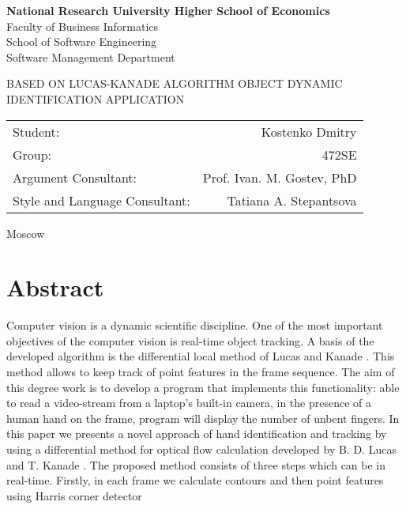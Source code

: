 \documentclass[12pt,a4paper,oneside,titlepage]{article}
\author{Kostenko}
\begin{document}
{
\thispagestyle{empty}
\newpage
\centering

\textbf{
National Research University Higher School of Economics\\
}
Faculty of Business Informatics\\
School of Software Engineering\\
Software Management Department

\vfill


\begin{large}
\MakeTextUppercase{
Based on Lucas-Kanade algorithm Object dynamic identification application
}
\end{large}


\vfill

\begin{tabular}{lr}
Student: & Kostenko Dmitry \\
Group: & 472SE \\
Argument Consultant: & Prof. Ivan. M. Gostev, PhD \\
Style and Language Consultant: & Tatiana A. Stepantsova
\end{tabular}

\vspace{\fill}

Moscow\\ \number\year
\clearpage
}


\section*{Abstract}
{
Computer vision is a dynamic scientific discipline.
One of the most important objectives of the computer vision is real-time object tracking.
A basis of the developed algorithm is the differential local method of Lucas and Kanade \cite{lucasKanade}.
This method allows to keep track of point features in the frame sequence. 
The aim of this degree work is to develop a program that implements this functionality:
able to read a video-stream from a laptop's built-in camera,
in the presence of a human hand on the frame, program will display the number of unbent fingers.
In this paper we presents a novel approach of hand identification and tracking by using a differential method for optical flow calculation developed by B. D. Lucas and T. Kanade \cite{lucasKanade}.
The proposed method consists of three steps which can be in real-time.
Firstly, in each frame we calculate contours and then point features using Harris corner detector \cite{harris_corner_detector}
}
\end{document}
